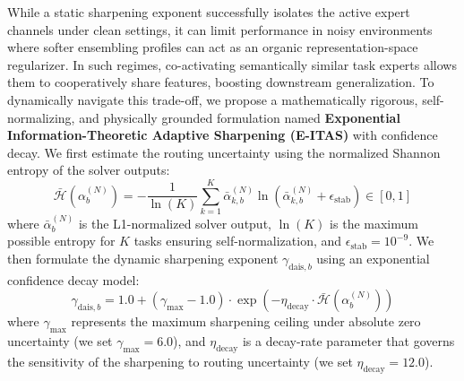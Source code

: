 While a static sharpening exponent successfully isolates the active expert channels under clean settings, it can limit performance in noisy environments where softer ensembling profiles can act as an organic representation-space regularizer. In such regimes, co-activating semantically similar task experts allows them to cooperatively share features, boosting downstream generalization. To dynamically navigate this trade-off, we propose a mathematically rigorous, self-normalizing, and physically grounded formulation named \textbf{Exponential Information-Theoretic Adaptive Sharpening (E-ITAS)} with confidence decay. We first estimate the routing uncertainty using the normalized Shannon entropy of the solver outputs:
\begin{equation}
    \bar{\mathcal{H}}\left(\alpha^{(N)}_b\right) = -\frac{1}{\ln(K)} \sum_{k=1}^K \bar{\alpha}_{k, b}^{(N)} \ln\left(\bar{\alpha}_{k, b}^{(N)} + \epsilon_{\text{stab}}\right) \in [0, 1]
\end{equation}
where $\bar{\alpha}^{(N)}_b$ is the L1-normalized solver output, $\ln(K)$ is the maximum possible entropy for $K$ tasks ensuring self-normalization, and $\epsilon_{\text{stab}} = 10^{-9}$. We then formulate the dynamic sharpening exponent $\gamma_{\text{dais}, b}$ using an exponential confidence decay model:
\begin{equation}
    \gamma_{\text{dais}, b} = 1.0 + (\gamma_{\max} - 1.0) \cdot \exp\left(-\eta_{\text{decay}} \cdot \bar{\mathcal{H}}\left(\alpha^{(N)}_b\right)\right)
\end{equation}
where $\gamma_{\max}$ represents the maximum sharpening ceiling under absolute zero uncertainty (we set $\gamma_{\max} = 6.0$), and $\eta_{\text{decay}}$ is a decay-rate parameter that governs the sensitivity of the sharpening to routing uncertainty (we set $\eta_{\text{decay}} = 12.0$). 

